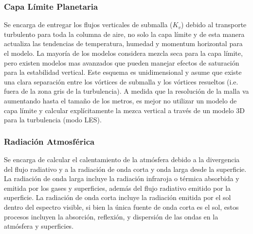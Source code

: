 \subsubsection{Capa Límite Planetaria}
Se encarga de entregar los flujos verticales de submalla ($K_v$) debido al transporte turbulento para toda la columna de aire, no solo la capa límite y de esta manera actualiza las tendencias de temperatura, humedad y momentum horizontal para el modelo. La mayoría de los modelos considera mezcla seca para la capa límite, pero existen modelos mas avanzados que pueden manejar efectos de saturación para la estabilidad vertical. Este esquema es unidimensional y asume que existe una clara separación entre los vórtices de submalla y los vórtices resueltos (i.e. fuera de la zona gris de la turbulencia). A medida que la resolución de la malla va aumentando hasta el tamaño de los metros, es mejor no utilizar un modelo de capa límite y calcular explícitamente la mezca vertical a través de un modelo 3D para la turbulencia (modo LES).
\subsubsection{Radiación Atmosférica}
Se encarga de calcular el calentamiento de la atmósfera debido a la divergencia del flujo radiativo y a la radiación de onda corta y onda larga desde la superficie. La radiación de onda larga incluye la radiación infraroja o térmica absorbida y emitida por los gases y superficies, además del flujo radiativo emitido por la superficie. La radiación de onda corta incluye la radiación emitida por el sol dentro del espectro visible, si bien la única fuente de onda corta es el sol, estos procesos incluyen la absorción, reflexión, y dispersión de las ondas en la atmósfera y superficies.

